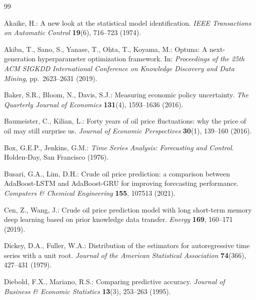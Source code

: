 \documentclass[11pt,a4paper]{article}
\begin{document}
%
\begin{thebibliography}{99}

Akaike, H.: A new look at the statistical model identification. \emph{IEEE Transactions on Automatic Control} \textbf{19}(6), 716--723 (1974).

Akiba, T., Sano, S., Yanase, T., Ohta, T., Koyama, M.: Optuna: A next-generation hyperparameter optimization framework. In: \emph{Proceedings of the 25th ACM SIGKDD International Conference on Knowledge Discovery and Data Mining}, pp.\ 2623--2631 (2019).

Baker, S.R., Bloom, N., Davis, S.J.: Measuring economic policy uncertainty. \emph{The Quarterly Journal of Economics} \textbf{131}(4), 1593--1636 (2016).

Baumeister, C., Kilian, L.: Forty years of oil price fluctuations: why the price of oil may still surprise us. \emph{Journal of Economic Perspectives} \textbf{30}(1), 139--160 (2016).

Box, G.E.P., Jenkins, G.M.: \emph{Time Series Analysis: Forecasting and Control}. Holden-Day, San Francisco (1976).

Busari, G.A., Lim, D.H.: Crude oil price prediction: a comparison between AdaBoost-LSTM and AdaBoost-GRU for improving forecasting performance. \emph{Computers \& Chemical Engineering} \textbf{155}, 107513 (2021).

Cen, Z., Wang, J.: Crude oil price prediction model with long short-term memory deep learning based on prior knowledge data transfer. \emph{Energy} \textbf{169}, 160--171 (2019).

Dickey, D.A., Fuller, W.A.: Distribution of the estimators for autoregressive time series with a unit root. \emph{Journal of the American Statistical Association} \textbf{74}(366), 427--431 (1979).

Diebold, F.X., Mariano, R.S.: Comparing predictive accuracy. \emph{Journal of Business \& Economic Statistics} \textbf{13}(3), 253--263 (1995).


\end{thebibliography}
\end{document}
